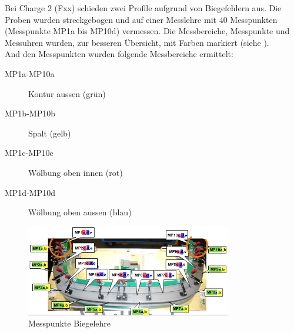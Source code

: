 \documentclass[12pt,a4paper,parskip]{scrartcl}
\begin{document}
 Bei Charge 2 (Fxx) schieden zwei Profile aufgrund von Biegefehlern aus. Die Proben wurden streckgebogen und auf einer Messlehre  mit 40 Messpunkten (Messpunkte MP1a bis MP10d) vermessen. Die Messbereiche, Messpunkte und Messuhren wurden, zur besseren Übersicht, mit Farben markiert (siehe ).  \\
 And den Messpunkten wurden folgende Messbereiche ermittelt:
 \begin{description}
 \item[MP1a-MP10a] Kontur aussen (grün)
 \item[MP1b-MP10b] Spalt (gelb)
 \item[MP1c-MP10c] Wölbung oben innen (rot)
 \item[MP1d-MP10d] Wölbung oben aussen (blau)
 \end{description}
\begin{figure}[hbtp]
\centering
\includegraphics[width=0.8\textwidth]{messpunktevdkda3}
\caption{Messpunkte Biegelehre}
\label{fig:messpunktevdkda3}
\end{figure} 
 
 
 
\end{document}
